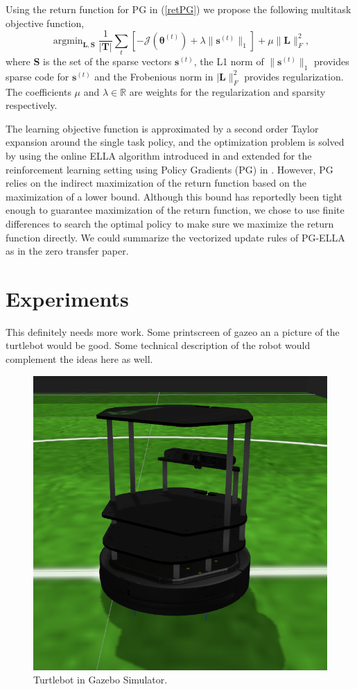 \documentclass{aamas2016}
\renewcommand{\Re}{\mathbb{R}}
\DeclareMathOperator*{\argmin}{argmin}
\begin{document}
Using the return function for PG in (\ref{retPG}) we propose the following multitask objective function,
\begin{displaymath}
 \argmin_{\boldsymbol{L},\boldsymbol{S}}\frac{1}{|\boldsymbol{T}|}\sum_{t}\left[ -\mathcal{J}(\boldsymbol{\theta}^{(t)}) + \lambda \| \boldsymbol{s}^{(t)} \|_{1} \right] + \mu\|\boldsymbol{L}\|_{F}^{2},
\end{displaymath}
where $\boldsymbol{S}$ is the set of the sparse vectors $\boldsymbol{s}^{(t)}$, the L1 norm of $\| \boldsymbol{s}^{(t)} \|_{1}$ 
provides sparse code for $\boldsymbol{s}^{(t)}$ and the Frobenious norm in $|\boldsymbol{L}\|_{F}^{2}$ provides regularization. The
coefficients $\mu$ and $\lambda \in \Re$ are weights for the regularization and sparsity respectively.

The learning objective function is approximated by a second order Taylor expansion around the single task policy, and the optimization
problem is solved by using the online ELLA algorithm introduced in \cite{Ruvolo2013} and extended for the reinforcement learning setting using Policy
Gradients (PG) in \cite{BouAmmar2014a}. However, PG relies on the indirect maximization of the return function based on the maximization of a lower bound.
Although this bound has reportedly been tight enough to guarantee maximization of the return function, we chose to use finite
differences to search the optimal policy to make sure we maximize the return function directly. {\color{red} We could summarize 
the vectorized update rules of PG-ELLA as in the zero transfer paper.}

\section{Experiments} \label{Experiments}
{\color{red} This definitely needs more work. Some printscreen of gazeo an a picture of the turtlebot would be good. Some technical description
of the robot would complement the ideas here as well.}


\begin{figure}[!htbp]
    \centering
        \includegraphics[width=.3\textwidth]{images/turtlebot_crop.png}
        \caption{Turtlebot in Gazebo Simulator. }\label{fig:numfeat}
\end{figure}
\end{document}
